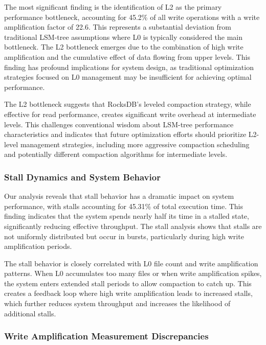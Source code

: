 \documentclass[11pt]{article}
\begin{document}
The most significant finding is the identification of L2 as the primary performance bottleneck, accounting for 45.2\% of all write operations with a write amplification factor of 22.6. This represents a substantial deviation from traditional LSM-tree assumptions where L0 is typically considered the main bottleneck. The L2 bottleneck emerges due to the combination of high write amplification and the cumulative effect of data flowing from upper levels. This finding has profound implications for system design, as traditional optimization strategies focused on L0 management may be insufficient for achieving optimal performance.

The L2 bottleneck suggests that RocksDB's leveled compaction strategy, while effective for read performance, creates significant write overhead at intermediate levels. This challenges conventional wisdom about LSM-tree performance characteristics and indicates that future optimization efforts should prioritize L2-level management strategies, including more aggressive compaction scheduling and potentially different compaction algorithms for intermediate levels.

\subsubsection{Stall Dynamics and System Behavior}

Our analysis reveals that stall behavior has a dramatic impact on system performance, with stalls accounting for 45.31\% of total execution time. This finding indicates that the system spends nearly half its time in a stalled state, significantly reducing effective throughput. The stall analysis shows that stalls are not uniformly distributed but occur in bursts, particularly during high write amplification periods.

The stall behavior is closely correlated with L0 file count and write amplification patterns. When L0 accumulates too many files or when write amplification spikes, the system enters extended stall periods to allow compaction to catch up. This creates a feedback loop where high write amplification leads to increased stalls, which further reduces system throughput and increases the likelihood of additional stalls.

\subsubsection{Write Amplification Measurement Discrepancies}
\end{document}
